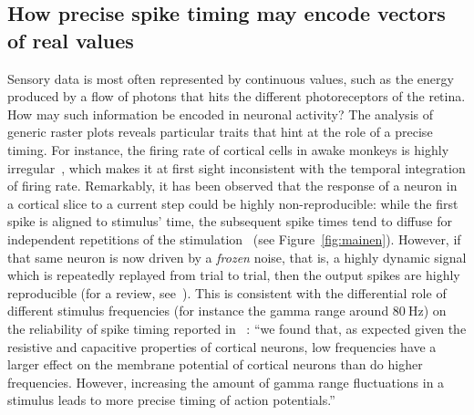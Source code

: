 \documentclass[brainsci, %
               review,submit,pdftex,moreauthors
               ]{Definitions/mdpi}
\begin{document}
\subsection{How precise spike timing may encode vectors of real values}
Sensory data is most often represented by continuous values, such as the energy produced by a flow of photons that hits the different photoreceptors of the retina. How may such information be encoded in neuronal activity? The analysis of generic raster plots reveals particular traits that hint at the role of a precise timing. For instance, the firing rate of cortical cells in awake monkeys is highly irregular~\citep{softky_highly_1993}, which makes it at first sight inconsistent with the temporal integration of firing rate. Remarkably, it has been observed that the response of a neuron in a cortical slice to a current step could be highly non-reproducible: while the first spike is aligned to stimulus' time, the subsequent spike times tend to diffuse for independent repetitions of the stimulation~\citep{bryant_spike_1976,mainen_reliability_1995} (see Figure~\ref{fig:mainen}). However, if that same neuron is now driven by a \emph{frozen} noise, that is, a highly dynamic signal which is repeatedly replayed from trial to trial, then the output spikes are highly reproducible (for a review, see~\citep{ermentrout_reliability_2008}). This is consistent with the differential role of different stimulus frequencies (for instance the gamma range around $80~\si{\Hz}$) on the reliability of spike timing reported in~\citep{nowak_influence_1997} : ``we found that, as expected given the resistive and capacitive properties of cortical neurons, low frequencies have a larger effect on the membrane potential of cortical neurons than do higher frequencies. However, increasing the amount of gamma range fluctuations in a stimulus leads to more precise timing of action potentials.'' 
\end{document}
